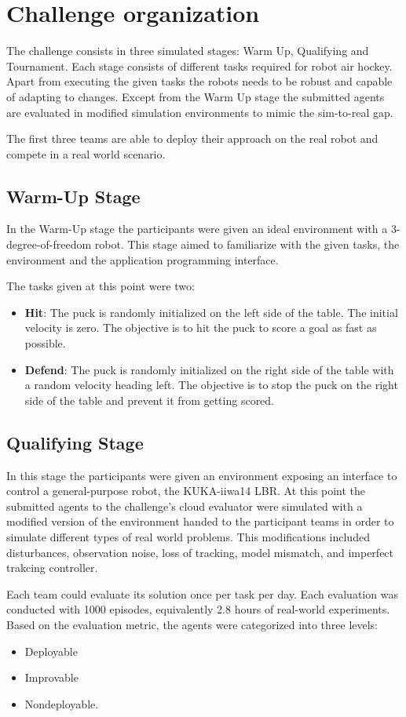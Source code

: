 \section{Challenge organization}
The challenge consists in three simulated stages: Warm Up, Qualifying and Tournament. Each stage consists of different tasks
required for robot air hockey. Apart from executing the given tasks the robots needs to be robust and capable of adapting to changes.
Except from the Warm Up stage the submitted agents are evaluated in modified simulation environments to mimic the sim-to-real gap.

The first three teams are able to deploy their approach on the real robot and compete in a real world scenario.

\subsection{Warm-Up Stage}
In the Warm-Up stage the participants were given an ideal environment with a 3-degree-of-freedom robot. This stage aimed to familiarize with the given tasks,
the environment and the application programming interface.

The tasks given at this point were two:
\begin{itemize}
    \item \textbf{Hit}: The puck is randomly initialized on the left side of the table. The initial velocity is zero. The objective is to hit the puck
    to score a goal as fast as possible.
    \item \textbf{Defend}: The puck is randomly initialized on the right side of the table with a random velocity heading left.
    The objective is to stop the puck on the right side of the table and prevent it from getting scored.
\end{itemize}
\subsection{Qualifying Stage}
In this stage the participants were given an environment exposing an interface to control a general-purpose robot, the KUKA-iiwa14 LBR.
At this point the submitted agents to the challenge's cloud evaluator were simulated with a modified version of the environment handed to the participant teams
in order to simulate different types of real world problems. This modifications included disturbances, observation noise, loss of tracking, model mismatch, and imperfect trakcing controller.

Each team could evaluate its solution once per task per day. Each evaluation was conducted with 1000 episodes, equivalently 2.8 hours of real-world experiments.
Based on the evaluation metric, the agents were categorized into three levels:
\begin{itemize}
    \item Deployable
    \item Improvable
    \item Nondeployable.
\end{itemize}


